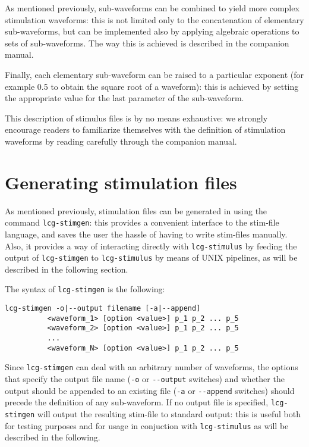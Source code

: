 As mentioned previously, sub-waveforms can be combined to yield more
complex stimulation waveforms: this is not limited only to the
concatenation of elementary sub-waveforms, but can be implemented also
by applying algebraic operations to sets of sub-waveforms. The way
this is achieved is described in the companion manual.

Finally, each elementary sub-waveform can be raised to a particular
exponent (for example 0.5 to obtain the square root of a waveform):
this is achieved by setting the appropriate value for the last
parameter of the sub-waveform.

This description of stimulus files is by no means exhaustive: we
strongly encourage readers to familiarize themselves with the
definition of stimulation waveforms by reading carefully through the
companion manual.

\section{Generating stimulation files}
As mentioned previously, stimulation files can be generated in
\progname using the command \verb+lcg-stimgen+: this provides a
convenient interface to the stim-file language, and saves the user the
hassle of having to write stim-files manually. Also, it provides a way
of interacting directly with \verb+lcg-stimulus+ by feeding the output
of \verb+lcg-stimgen+ to \verb+lcg-stimulus+ by means of UNIX pipelines,
as will be described in the following section.

The syntax of \verb+lcg-stimgen+ is the following:
\begin{verbatim}
lcg-stimgen -o|--output filename [-a|--append] 
          <waveform_1> [option <value>] p_1 p_2 ... p_5
          <waveform_2> [option <value>] p_1 p_2 ... p_5
          ...
          <waveform_N> [option <value>] p_1 p_2 ... p_5
\end{verbatim}
Since \verb+lcg-stimgen+ can deal with an arbitrary number of
waveforms, the options that specify the output file name (\verb+-o+ or
\verb+--output+ switches) and whether the output should be appended to
an existing file (\verb+-a+ or \verb+--append+ switches) should
precede the definition of any sub-waveform. If no output file is
specified, \verb+lcg-stimgen+ will output the resulting stim-file to
standard output: this is useful both for testing purposes and for
usage in conjuction with \verb+lcg-stimulus+ as will be described in
the following.

